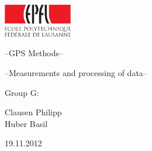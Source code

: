 \begin{flushright}
\includegraphics[width=3cm]{Logos/logo_epfl_coul-crop}
\end{flushright}

\vspace{1cm}

\begin{center}

\vspace{1cm}

\LARGE
--GPS Methods--

\vspace{2cm}

--Measurements and processing of data--

\vspace{1cm}

\large
Group G:\\

\vspace{0.5cm}

Clausen Philipp\\
Huber Basil\\

\vspace{1cm}

19.11.2012\\


\end{center}
\normalsize